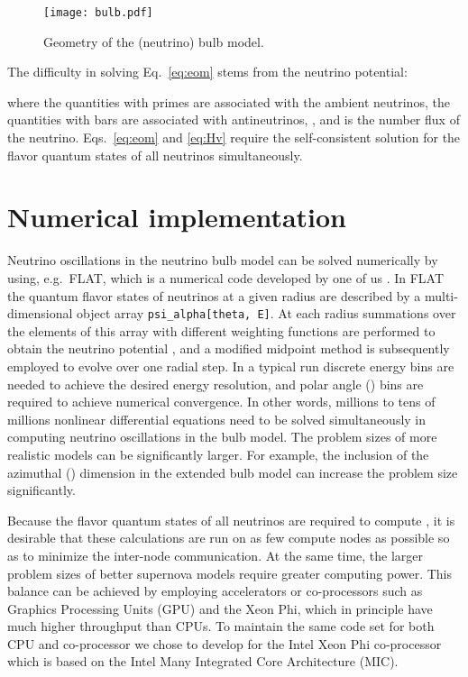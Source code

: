 \documentclass{sig-alternate}
\begin{document}
\begin{figure}
\centering
\texttt{[image: bulb.pdf]}
\caption{Geometry of the (neutrino) bulb model.}
\label{fig:bulb}
\end{figure}

The difficulty in solving Eq.~\eqref{eq:eom} stems from the neutrino
potential:

where the quantities with primes are associated with the ambient
neutrinos, the quantities with bars are associated with
antineutrinos, , and
 is the number flux of the neutrino.
Eqs.~\eqref{eq:eom} and \eqref{eq:Hv} require the self-consistent solution for the flavor quantum states of all neutrinos simultaneously.



\section{Numerical implementation}
Neutrino oscillations in the neutrino bulb model can be solved
numerically by using, e.g.\ FLAT, which is a numerical code developed
by one of us \cite{Duan_Simulating_2008}. In FLAT the quantum flavor
states  of neutrinos at a given radius 
are described by a multi-dimensional object array 
\texttt{psi\_alpha[theta, E]}. At each radius  summations over the elements of this array with different weighting functions are performed to obtain the
neutrino potential ,
and a modified midpoint method is subsequently employed to evolve
 over one radial step. In a typical run
 discrete energy bins are needed to achieve the desired
energy resolution, and  polar angle () bins
are required to 
achieve numerical convergence. In other words, millions to tens of
millions nonlinear differential equations need to be solved
simultaneously in computing neutrino oscillations in the bulb model.
The problem sizes of more realistic models can be significantly
larger. For example, the inclusion of the azimuthal () dimension in the
extended bulb model can increase the problem size significantly.

Because the flavor quantum states of all neutrinos are required to
compute , it is desirable that these calculations are run on
as few compute nodes as possible so as to minimize the inter-node communication. At the same time, the larger problem sizes of better supernova models
require greater computing power. This balance can be achieved by
employing accelerators or co-processors such as Graphics Processing Units (GPU) and the Xeon Phi, which in principle have much higher throughput than CPUs. 
To maintain the same code set for both CPU and co-processor we chose to
develop for the Intel Xeon Phi co-processor which is based on the Intel
Many Integrated Core Architecture (MIC).
\end{document}
